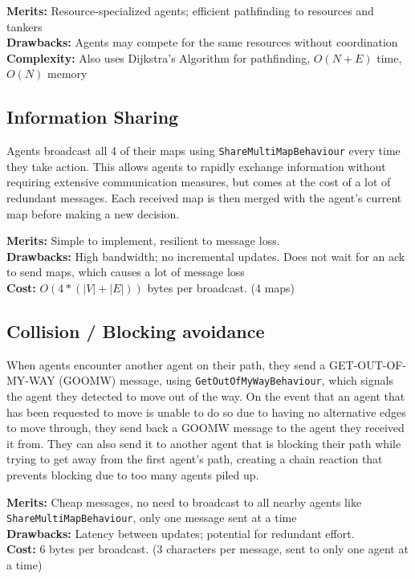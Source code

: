 \documentclass[a4paper, 12pt]{article}
\begin{document}
\textbf{Merits:} Resource-specialized agents; efficient pathfinding to resources and tankers\\
\textbf{Drawbacks:} Agents may compete for the same resources without coordination\\
\textbf{Complexity:} Also uses Dijkstra's Algorithm for pathfinding, $O(N+E)$ time, $O(N)$ memory

\subsection{Information Sharing}
Agents broadcast all 4 of their maps using \texttt{ShareMultiMapBehaviour} every time they take action. This allows agents to rapidly exchange information without requiring extensive communication measures, but comes at the cost of a lot of redundant messages. Each received map is then merged with the agent's current map before making a new decision.

\textbf{Merits:} Simple to implement, resilient to message loss.\\
\textbf{Drawbacks:} High bandwidth; no incremental updates. Does not wait for an ack to send maps, which causes a lot of message loss\\
\textbf{Cost:} $O(4*(|V|+|E|))$ bytes per broadcast. (4 maps)

\subsection{Collision / Blocking avoidance}
When agents encounter another agent on their path, they send a GET-OUT-OF-MY-WAY (GOOMW) message, using \texttt{GetOutOfMyWayBehaviour}, which signals the agent they detected to move out of the way. On the event that an agent that has been requested to move is unable to do so due to having no alternative edges to move through, they send back a GOOMW message to the agent they received it from. They can also send it to another agent that is blocking their path while trying to get away from the first agent's path, creating a chain reaction that prevents blocking due to too many agents piled up.

\textbf{Merits:} Cheap messages, no need to broadcast to all nearby agents like \texttt{ShareMultiMapBehaviour}, only one message sent at a time\\
\textbf{Drawbacks:} Latency between updates; potential for redundant effort.\\
\textbf{Cost:} 6 bytes per broadcast. (3 characters per message, sent to only one agent at a time)
\end{document}

